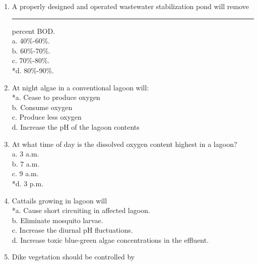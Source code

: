 \begin{enumerate}
\item  A properly designed and operated wastewater stabilization pond will remove \rule{1.5cm}{0.3mm} percent BOD. \\


a. 40\%-60\%. \\

b. 60\%-70\%. \\

c. 70\%-80\%. \\

*d. 80\%-90\%. \\


\item  At night algae in a conventional lagoon will: \\


*a. Cease to produce oxygen \\

b. Consume oxygen \\

c. Produce less oxygen \\

d. Increase the pH of the lagoon contents \\


\item  At what time of day is the dissolved oxygen content highest in a lagoon? \\


a. 3 a.m. \\

b. 7 a.m. \\

c. 9 a.m. \\

*d. 3 p.m. \\


\item  Cattails growing in lagoon will \\


*a. Cause short circuiting in affected lagoon. \\

b. Eliminate mosquito larvae. \\

c. Increase the diurnal pH fluctuations. \\

d. Increase toxic blue-green algae concentrations in the effluent. \\


\item  Dike vegetation should be controlled by \\



\end{enumerate}
